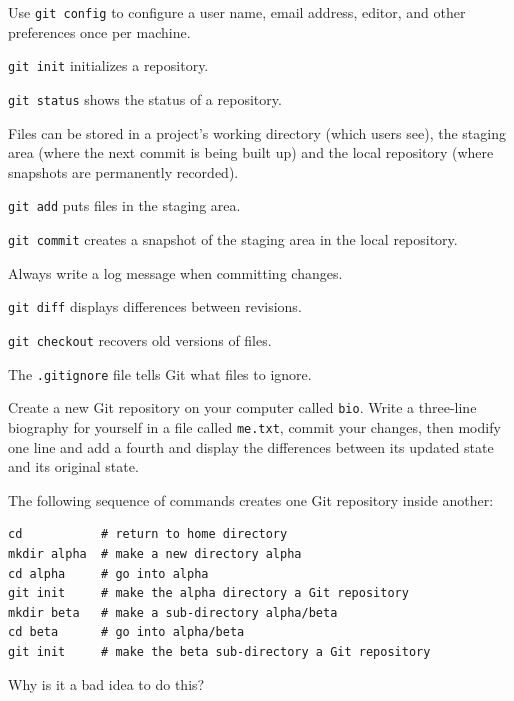 \documentclass{book}
\begin{document}
\begin{keypoints}
\begin{swcitemize}
\item
  Use \texttt{git config} to configure a user name, email address,
  editor, and other preferences once per machine.
\item
  \texttt{git init} initializes a repository.
\item
  \texttt{git status} shows the status of a repository.
\item
  Files can be stored in a project's working directory (which users
  see), the staging area (where the next commit is being built up) and
  the local repository (where snapshots are permanently recorded).
\item
  \texttt{git add} puts files in the staging area.
\item
  \texttt{git commit} creates a snapshot of the staging area in the
  local repository.
\item
  Always write a log message when committing changes.
\item
  \texttt{git diff} displays differences between revisions.
\item
  \texttt{git checkout} recovers old versions of files.
\item
  The \texttt{.gitignore} file tells Git what files to ignore.
\end{swcitemize}
\end{keypoints}

\begin{challenge}
  Create a new Git repository on your computer called \texttt{bio}.
  Write a three-line biography for yourself in a file called
  \texttt{me.txt}, commit your changes, then modify one line and add a
  fourth and display the differences between its updated state and its
  original state.
\end{challenge}

\begin{challenge}
  The following sequence of commands creates one Git repository inside
  another:

\begin{verbatim}
cd           # return to home directory
mkdir alpha  # make a new directory alpha
cd alpha     # go into alpha
git init     # make the alpha directory a Git repository
mkdir beta   # make a sub-directory alpha/beta
cd beta      # go into alpha/beta
git init     # make the beta sub-directory a Git repository
\end{verbatim}

  Why is it a bad idea to do this?
\end{challenge}
\end{document}
